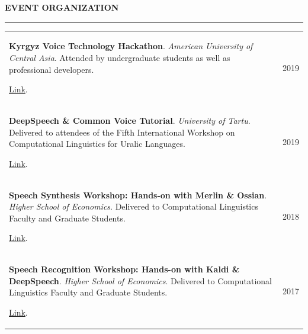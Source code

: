 \documentclass{cv} %
\begin{document}




\begin{minipage}{\textwidth}
\sectionskip
\MakeUppercase{\textbf{Event Organization}}
  \sectionlineskip
  \hrule
\vspace{.5cm}

\renewcommand{\arraystretch}{1.5} %

\begin{tabular}{@{}p{}p{}@{}}
  {\bf Kyrgyz Voice Technology Hackathon}. {\em American University of Central Asia}. {Attended by undergraduate students as well as professional developers}. 
  
  \href{https://jrmeyer.github.io/kyrgyz-voice-hackathon/}{Link}.
  &
  \hfill {2019}
  \\
  {\bf DeepSpeech \& Common Voice Tutorial}. {\em University of Tartu}. {Delivered to attendees of the Fifth International Workshop on Computational Linguistics for Uralic Languages.}
  
  \href{https://sisu.ut.ee/iwclul2019/avaleht}{Link}.
  &
  \hfill {2019}
  \\
  {\bf Speech Synthesis Workshop: Hands-on with Merlin \& Ossian}. {\em Higher School of Economics}. {Delivered to Computational Linguistics Faculty and Graduate Students.}
  
  \href{http://jrmeyer.github.io/tts/2016/12/09/tts-workshop.html}{Link}.
  &
  \hfill {2018}
  \\
  {\bf Speech Recognition Workshop: Hands-on with Kaldi \& DeepSpeech}. {\em Higher School of Economics}.  {Delivered to Computational Linguistics Faculty and Graduate Students.}
  
  \href{http://jrmeyer.github.io/misc/stt-vishka.pdf}{Link}.
  &
  \hfill {2017}
  \\
\end{tabular}

\end{minipage}




\end{document}
